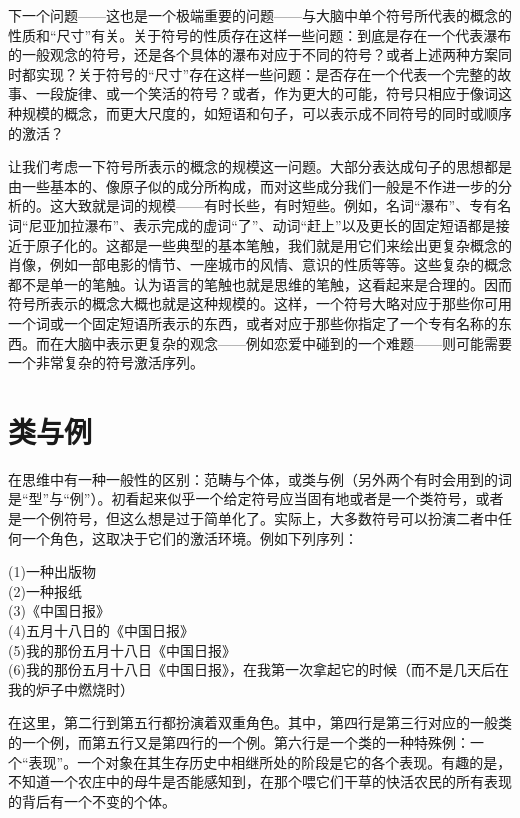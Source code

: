 下一个问题——这也是一个极端重要的问题——与大脑中单个符号所代表的概念的性质和“尺寸”有关。关于符号的性质存在这样一些问题：到底是存在一个代表瀑布的一般观念的符号，还是各个具体的瀑布对应于不同的符号？或者上述两种方案同时都实现？关于符号的“尺寸”存在这样一些问题：是否存在一个代表一个完整的故事、一段旋律、或一个笑活的符号？或者，作为更大的可能，符号只相应于像词这种规模的概念，而更大尺度的，如短语和句子，可以表示成不同符号的同时或顺序的激活？

让我们考虑一下符号所表示的概念的规模这一问题。大部分表达成句子的思想都是由一些基本的、像原子似的成分所构成，而对这些成分我们一般是不作进一步的分析的。这大致就是词的规模——有时长些，有时短些。例如，名词“瀑布”、专有名词“尼亚加拉瀑布”、表示完成的虚词“了”、动词“赶上”以及更长的固定短语都是接近于原子化的。这都是一些典型的基本笔触，我们就是用它们来绘出更复杂概念的肖像，例如一部电影的情节、一座城市的风情、意识的性质等等。这些复杂的概念都不是单一的笔触。认为语言的笔触也就是思维的笔触，这看起来是合理的。因而符号所表示的概念大概也就是这种规模的。这样，一个符号大略对应于那些你可用一个词或一个固定短语所表示的东西，或者对应于那些你指定了一个专有名称的东西。而在大脑中表示更复杂的观念——例如恋爱中碰到的一个难题——则可能需要一个非常复杂的符号激活序列。

\section{类与例}

在思维中有一种一般性的区别：范畴与个体，或类与例（另外两个有时会用到的词是“型”与“例”）。初看起来似乎一个给定符号应当固有地或者是一个类符号，或者是一个例符号，但这么想是过于简单化了。实际上，大多数符号可以扮演二者中任何一个角色，这取决于它们的激活环境。例如下列序列：

%
(1)\enspace 一种出版物\\
(2)\enspace 一种报纸\\
(3)\enspace 《中国日报》\\
(4)\enspace 五月十八日的《中国日报》\\
(5)\enspace 我的那份五月十八日《中国日报》\\
(6)\enspace 我的那份五月十八日《中国日报》，在我第一次拿起它的时候（而不是几天后在我的炉子中燃烧时）

在这里，第二行到第五行都扮演着双重角色。其中，第四行是第三行对应的一般类的一个例，而第五行又是第四行的一个例。第六行是一个类的一种特殊例：一个“表现”。一个对象在其生存历史中相继所处的阶段是它的各个表现。有趣的是，不知道一个农庄中的母牛是否能感知到，在那个喂它们干草的快活农民的所有表现的背后有一个不变的个体。

